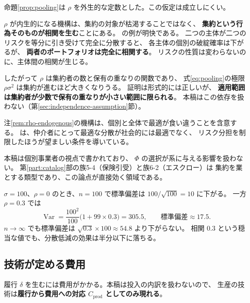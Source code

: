 \begin{remark}
\label{rem:rho-endogenous}
命題\ref{prop:pooling}は $\rho$ を外生的な定数とした。この仮定は成立しにくい。

$\rho$ が内生的になる機構は、集約の対象が枯渇することではなく、
\textbf{集約という行為そのものが相関を生む}ことにある。
\cite{wagner2010} の例が明快である。
二つの主体が二つのリスクを等分に引き受けて完全に分散すると、
各主体の個別の破綻確率は下がるが、
\textbf{両者のポートフォリオは完全に相関する}。
リスクの性質は変わらないのに、主体間の相関が生じる。

したがって $\rho$ は集約者の数と保有の重なりの関数であり、
式\eqref{eq:pooling}の極限 $\rho\sigma^2$ は集約が進むほど大きくなりうる。
証明は形式的には正しいが、
\textbf{適用範囲は集約者が少数で保有の重なりが小さい範囲に限られる}。
本稿はこの依存を扱わない（第\ref{sec:independence-assumption}節）。
\end{remark}

\begin{remark}[集約の社会的最適性]
\label{rem:pooling-social}
注\ref{rem:rho-endogenous}の機構は、個別と全体で最適が食い違うことを含意する。
\cite{ibragimov2011} は、仲介者にとって最適な分散が社会的には最適でなく、
リスク分担を制限したほうが望ましい条件を導いている。

本稿は個別事業者の視点で書かれており、
$\Phi$ の選択が系に与える影響を扱わない。
第\ref{part:catalog}部の族5-4（保険引受）と族6-2（エスクロー）は
集約を業とする類型であり、この論点が直接効く領域である。
\end{remark}

\begin{example}[相関が効く速さ]
$\sigma=100$、$\rho=0$ のとき、$n=100$ で標準偏差は $100/\sqrt{100}=10$ に下がる。
一方 $\rho=0.3$ では
\[
\operatorname{Var}=\frac{100^2}{100}\bigl(1+99\times 0.3\bigr)=305.5,\qquad
\text{標準偏差}\approx 17.5 .
\]
$n\to\infty$ でも標準偏差は $\sqrt{0.3}\times 100 \approx 54.8$ より下がらない。
相関 $0.3$ という穏当な値でも、分散低減の効果は半分以下に落ちる。
\end{example}

\subsection{技術が定める費用}
\label{sec:production}

履行 $\delta$ を生むには費用がかかる。本稿は投入の内訳を扱わないので、
生産の技術は\textbf{履行から費用への対応 $C_{\mathrm{prod}}$ としてのみ現れる}。


